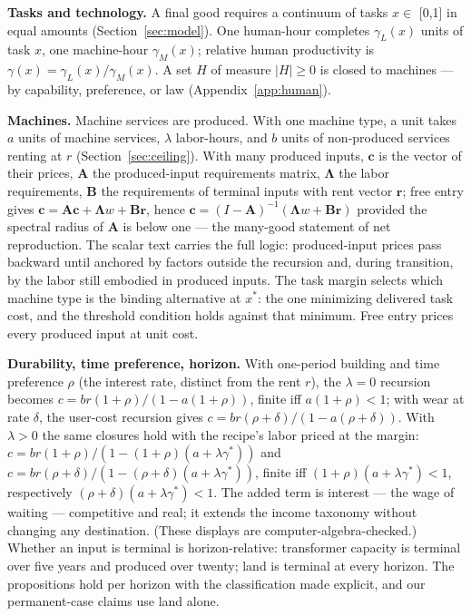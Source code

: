 \documentclass[12pt]{article}
\theoremstyle{plain}
\begin{document}
\textbf{Tasks and technology.} A final good requires a continuum of tasks $x \in$ [0,1] in equal amounts (Section~\ref{sec:model}). One human-hour completes $\gamma _L(x)$ units of task $x$, one machine-hour $\gamma _M(x)$; relative human productivity is $\gamma (x) = \gamma _L(x)/\gamma _M(x)$. A set $H$ of measure $|H| \ge 0$ is closed to machines --- by capability, preference, or law (Appendix~\ref{app:human}).

\textbf{Machines.} Machine services are produced. With one machine type, a unit takes $a$ units of machine services, $\lambda$ labor-hours, and $b$ units of non-produced services renting at $r$ (Section~\ref{sec:ceiling}). With many produced inputs, $\mathbf{c}$ is the vector of their prices, $\mathbf{A}$ the produced-input requirements matrix, $\boldsymbol{\Lambda}$ the labor requirements, $\mathbf{B}$ the requirements of terminal inputs with rent vector $\mathbf{r}$; free entry gives $\mathbf{c} = \mathbf{A}\mathbf{c} + \boldsymbol{\Lambda}w + \mathbf{B}\mathbf{r}$, hence $\mathbf{c} = (I-\mathbf{A})^{-1}(\boldsymbol{\Lambda}w + \mathbf{B}\mathbf{r})$ provided the spectral radius of $\mathbf{A}$ is below one --- the many-good statement of net reproduction. The scalar text carries the full logic: produced-input prices pass backward until anchored by factors outside the recursion and, during transition, by the labor still embodied in produced inputs. The task margin selects which machine type is the binding alternative at $x^*$: the one minimizing delivered task cost, and the threshold condition holds against that minimum. Free entry prices every produced input at unit cost.

\textbf{Durability, time preference, horizon.} With one-period building and time preference $\rho$ (the interest rate, distinct from the rent $r$), the $\lambda = 0$ recursion becomes $c = br(1+\rho )/(1 - a(1+\rho ))$, finite iff $a(1+\rho ) < 1$; with wear at rate $\delta$, the user-cost recursion gives $c = br(\rho +\delta )/(1 - a(\rho +\delta ))$. With $\lambda > 0$ the same closures hold with the recipe's labor priced at the margin: $c = br(1+\rho )/(1 - (1+\rho )(a + \lambda \gamma ^*))$ and $c = br(\rho +\delta )/(1 - (\rho +\delta )(a + \lambda \gamma ^*))$, finite iff $(1+\rho )(a + \lambda \gamma ^*) < 1$, respectively $(\rho +\delta )(a + \lambda \gamma ^*) < 1$. The added term is interest --- the wage of waiting --- competitive and real; it extends the income taxonomy without changing any destination. (These displays are computer-algebra-checked.) Whether an input is terminal is horizon-relative: transformer capacity is terminal over five years and produced over twenty; land is terminal at every horizon. The propositions hold per horizon with the classification made explicit, and our permanent-case claims use land alone.
\end{document}
